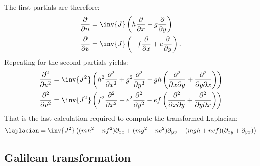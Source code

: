 %
The first partials are therefore:
%
\begin{equation}\label{eqn:lorentz:280}
\begin{aligned}
\frac{\partial}{\partial u}
&= \inv{J} \left(h \frac{\partial}{\partial x} - g \frac{\partial}{\partial y}\right) \\
\frac{\partial}{\partial v}
&= \inv{J} \left(-f \frac{\partial}{\partial x} + e \frac{\partial}{\partial y}\right).
\end{aligned}
\end{equation}
%
Repeating for the second partials yields:
%
\begin{equation}\label{eqn:lorentz:300}
\begin{aligned}
\frac{\partial^2}{\partial u^2}
&= \inv{J^2} \left(
h^2 \frac{\partial^2}{\partial x^2} + g^2 \frac{\partial^2}{\partial y^2}
-g h \left( \frac{\partial^2}{\partial x \partial y} + \frac{\partial^2}{\partial y \partial x} \right)
\right) \\
\frac{\partial^2}{\partial v^2}
&= \inv{J^2} \left(
f^2 \frac{\partial^2}{\partial x^2} + e^2 \frac{\partial^2}{\partial y^2}
-e f \left( \frac{\partial^2}{\partial x \partial y} + \frac{\partial^2}{\partial y \partial x} \right)
\right)
\end{aligned}
\end{equation}
%
That is the last calculation required to compute the transformed Laplacian:
%
\begin{equation}\label{eqn:Lor:laplaciantx}
\laplacian = \inv{J^2}
\left(
(m h^2 + n f^2)\partial_{xx}
+(m g^2 + n e^2)\partial_{yy}
-(m g h + n e f)( \partial_{xy} + \partial_{yx}  )
\right)
\end{equation}
%
\subsection{Galilean transformation}

